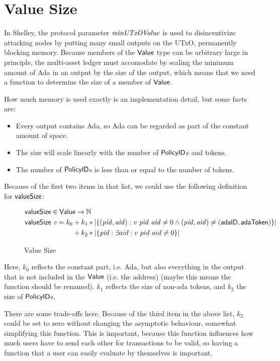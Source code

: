 \section{Value Size}
\label{sec:value-size}

In Shelley, the protocol parameter $\mathit{minUTxOValue}$ is used to
disincentivize attacking nodes by putting many small outputs on the
UTxO, permanently blocking memory. Because members of the $\mathsf{Value}$
type can be arbitrary large in principle, the multi-asset ledger must
accomodate by scaling the minimum amount of Ada in an output by the
size of the output, which means that we need a function to determine
the size of a member of $\mathsf{Value}$.

How much memory is used exactly is an implementation detail, but some facts are:
\begin{itemize}
  \item Every output contains Ada, so Ada can be regarded as part of the constant amount of space.
  \item The size will scale linearly with the number of $\mathsf{PolicyID}$s and tokens.
  \item The number of $\mathsf{PolicyID}$s is less than or equal to the number of tokens.
\end{itemize}

Because of the first two items in that list, we could use the following definition for $\mathsf{valueSize}$:

\begin{figure*}[h]
  \begin{align*}
    & \fun{valueSize} \in \Value \to \N \\
    & \fun{valueSize} ~\var{v} = k_0 + k_1 * |\{ (\var{pid}, \var{aid}) : \var{v}~\var{pid}~\var{aid} \neq 0
            \land (\var{pid}, \var{aid}) \neq (\mathsf{adaID}, \mathsf{adaToken}) \}| \\
    & \phantom{\fun{valueSize} ~\var{v} = k_0} + k_2 * |\{ \var{pid} : \exists aid : v~pid~aid \neq 0 \}|
  \end{align*}
  \caption{Value Size}
  \label{fig:test}
\end{figure*}

Here, $k_0$ reflects the constant part, i.e. Ada, but also everything
in the output that is not included in the $\mathsf{Value}$ (i.e. the address)
(maybe this means the function should be renamed). $k_1$ reflects the
size of non-ada tokens, and $k_2$ the size of $\mathsf{PolicyID}$s.

There are some trade-offs here. Because of the third item in the above
list, $k_2$ could be set to zero without changing the asymptotic
behaviour, somewhat simplifying this function. This is important,
because this function influences how much users have to send each
other for transactions to be valid, so having a function that a user
can easily evaluate by themselves is important.
